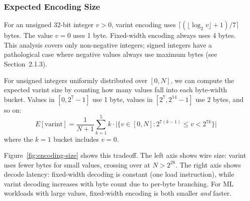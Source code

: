 \documentclass[10pt,onecolumn]{article}
\begin{document}
\subsubsection{Expected Encoding Size}

For an unsigned 32-bit integer $v > 0$, varint encoding uses $\lceil (\lfloor \log_2 v \rfloor + 1) / 7 \rceil$ bytes. The value $v = 0$ uses 1 byte. Fixed-width encoding always uses 4 bytes. This analysis covers only non-negative integers; signed integers have a pathological case where negative values always use maximum bytes (see Section~2.1.3).

For unsigned integers uniformly distributed over $[0, N]$, we can compute the expected varint size by counting how many values fall into each byte-width bucket. Values in $[0, 2^7-1]$ use 1 byte, values in $[2^7, 2^{14}-1]$ use 2 bytes, and so on:
\begin{equation}
E[\text{varint}] = \frac{1}{N+1} \sum_{k=1}^{5} k \cdot \bigl|\{v \in [0,N] : 2^{7(k-1)} \leq v < 2^{7k}\}\bigr|
\label{eq:varint-expected}
\end{equation}
where the $k=1$ bucket includes $v=0$.

Figure~\ref{fig:encoding-size} shows this tradeoff. The left axis shows wire size: varint uses fewer bytes for small values, crossing over at $N > 2^{28}$. The right axis shows decode latency: fixed-width decoding is constant (one load instruction), while varint decoding increases with byte count due to per-byte branching. For ML workloads with large values, fixed-width encoding is both smaller \textit{and} faster.
\end{document}
